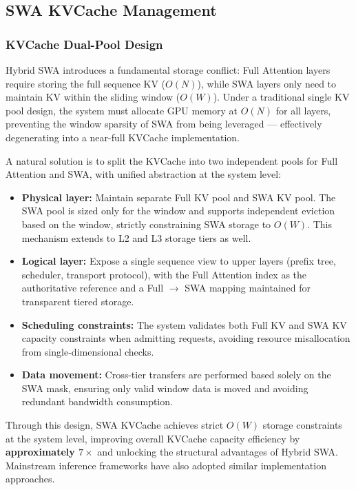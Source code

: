 \subsection{SWA KVCache Management}

\subsubsection{KVCache Dual-Pool Design}

Hybrid SWA introduces a fundamental storage conflict: Full Attention layers require storing the full sequence KV ($O(N)$), while SWA layers only need to maintain KV within the sliding window ($O(W)$). Under a traditional single KV pool design, the system must allocate GPU memory at $O(N)$ for all layers, preventing the window sparsity of SWA from being leveraged --- effectively degenerating into a near-full KVCache implementation.

A natural solution is to split the KVCache into two independent pools for Full Attention and SWA, with unified abstraction at the system level:

\begin{itemize}
    \item \textbf{Physical layer:} Maintain separate Full KV pool and SWA KV pool. The SWA pool is sized only for the window and supports independent eviction based on the window, strictly constraining SWA storage to $O(W)$. This mechanism extends to L2 and L3 storage tiers as well.
    \item \textbf{Logical layer:} Expose a single sequence view to upper layers (prefix tree, scheduler, transport protocol), with the Full Attention index as the authoritative reference and a Full $\to$ SWA mapping maintained for transparent tiered storage.
    \item \textbf{Scheduling constraints:} The system validates both Full KV and SWA KV capacity constraints when admitting requests, avoiding resource misallocation from single-dimensional checks.
    \item \textbf{Data movement:} Cross-tier transfers are performed based solely on the SWA mask, ensuring only valid window data is moved and avoiding redundant bandwidth consumption.
\end{itemize}

Through this design, SWA KVCache achieves strict $O(W)$ storage constraints at the system level, improving overall KVCache capacity efficiency by \textbf{approximately $7\times$} and unlocking the structural advantages of Hybrid SWA. Mainstream inference frameworks have also adopted similar implementation approaches.

